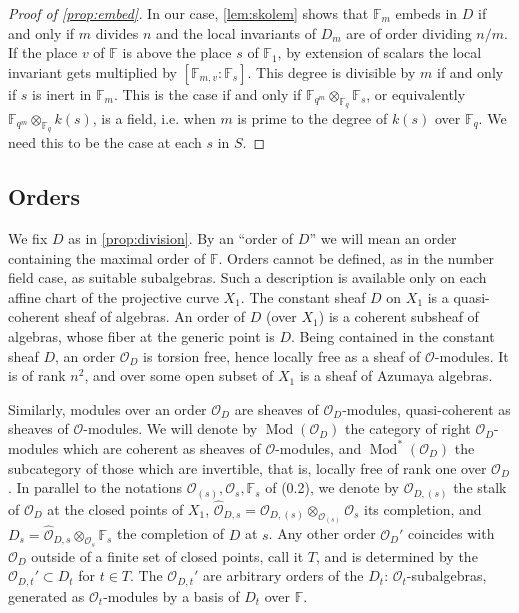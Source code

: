 \documentclass[11pt,a4paper]{article}
\theoremstyle{plain}
\theoremstyle{definition}
\DeclareMathOperator{\Mod}{Mod}
\newcommand{\Fq}{\mathbb{F}_q}
\newcommand{\F}{\mathbb{F}}
\begin{document}
\begin{proof}[Proof of \ref{prop:embed}]
In our case, \ref{lem:skolem} shows that $\mathbb{F}_m$ embeds in $D$ if and only if $m$ divides $n$ and the local invariants of $D_m$ are of order dividing $n/m$. If the place $v$ of $\mathbb{F}$ is above the place $s$ of $\mathbb{F}_1$, by extension of scalars the local invariant gets multiplied by $[\mathbb{F}_{m,v} : \mathbb{F}_s]$. This degree is divisible by $m$ if and only if $s$ is inert in $\mathbb{F}_m$. This is the case if and only if $\F_{q^m} \otimes_{\Fq} \mathbb{F}_s$, or equivalently $\F_{q^m} \otimes_{\Fq} k(s)$, is a field, i.e. when $m$ is prime to the degree of $k(s)$ over $\Fq$. We need this to be the case at each $s$ in $S$.
\end{proof}

\subsection{Orders}
We fix $D$ as in \ref{prop:division}. By an ``order of $D$'' we will mean an order containing the maximal order of $\mathbb{F}$. Orders cannot be defined, as in the number field case, as suitable subalgebras. Such a description is available only on each affine chart of the projective curve $X_1$. The constant sheaf $D$ on $X_1$ is a quasi-coherent sheaf of algebras. An order of $D$ (over $X_1$) is a coherent subsheaf of algebras, whose fiber at the generic point is $D$. Being contained in the constant sheaf $D$, an order $\mathcal{O}_D$ is torsion free, hence locally free as a sheaf of $\mathcal{O}$-modules. It is of rank $n^2$, and over some open subset of $X_1$ is a sheaf of Azumaya algebras.

Similarly, modules over an order $\mathcal{O}_D$ are sheaves of $\mathcal{O}_D$-modules, quasi-coherent as sheaves of $\mathcal{O}$-modules. We will denote by $\Mod(\mathcal{O}_D)$ the category of right $\mathcal{O}_D$-modules which are coherent as sheaves of $\mathcal{O}$-modules, and $\Mod^*(\mathcal{O}_D)$ the subcategory of those which are invertible, that is, locally free of rank one over $\mathcal{O}_D$. In parallel to the notations $\mathcal{O}_{(s)}, \mathcal{O}_s, \mathbb{F}_s$ of (0.2), we denote by $\mathcal{O}_{D,(s)}$ the stalk of $\mathcal{O}_D$ at the closed points of $X_1$, $\widehat{\mathcal{O}}_{D,s} = \mathcal{O}_{D,(s)} \otimes_{\mathcal{O}_{(s)}} \mathcal{O}_s$ its completion, and $D_s = \widehat{\mathcal{O}}_{D,s} \otimes_{\mathcal{O}_s} \mathbb{F}_s$ the completion of $D$ at $s$. Any other order $\mathcal{O}_D'$ coincides with $\mathcal{O}_D$ outside of a finite set of closed points, call it $T$, and is determined by the $\mathcal{O}_{D,t}' \subset D_t$ for $t \in T$. The $\mathcal{O}_{D,t}'$ are arbitrary orders of the $D_t$: $\mathcal{O}_t$-subalgebras, generated as $\mathcal{O}_t$-modules by a basis of $D_t$ over $\mathbb{F}$.
\end{document}
